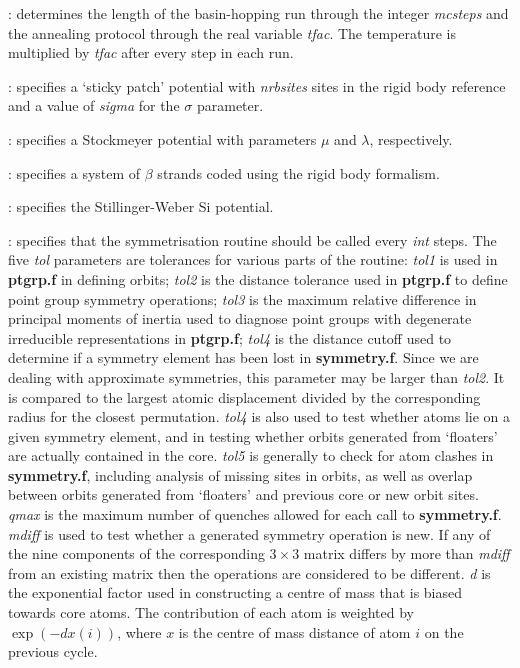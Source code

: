 : determines the length of the
basin-hopping run through the integer {\it mcsteps\/} and the annealing protocol through
the real variable {\it tfac\/}. The temperature is multiplied by {\it tfac\/}
after every step in each run. 

: specifies a `sticky patch' potential with {\it nrbsites}
sites in the rigid body reference and a value of {\it sigma} for the $\sigma$ parameter.

: specifies a Stockmeyer potential with parameters
$\mu$ and $\lambda$, respectively.

: specifies a system of $\beta$ strands coded using the rigid body formalism.

: specifies the Stillinger-Weber Si potential.

: specifies that the symmetrisation
routine should be called every {\it int} steps. The five {\it tol} parameters are tolerances
for various parts of the routine: 
{\it tol1} is used in {\bf ptgrp.f} in defining orbits; 
{\it tol2} is the distance tolerance used in {\bf ptgrp.f} to define point group symmetry operations;
{\it tol3} is the maximum relative difference in principal moments of inertia used to
diagnose point groups with degenerate irreducible representations in {\bf ptgrp.f};
{\it tol4} is the distance cutoff used to determine if a symmetry element has been lost in {\bf symmetry.f}.
Since we are dealing with approximate symmetries, this parameter may be larger than {\it tol2}.
It is compared to the largest atomic displacement divided by the corresponding radius
for the closest permutation.
{\it tol4} is also used to test whether atoms lie on a given symmetry element, and in testing 
whether orbits generated from `floaters' are actually contained in the core.
{\it tol5} is generally to check for atom clashes in {\bf symmetry.f}, including analysis of
missing sites in orbits, as well as overlap between orbits generated from `floaters' and
previous core or new orbit sites.
{\it qmax} is the maximum number of quenches allowed for each call to {\bf symmetry.f}.
{\it mdiff} is used to test whether a generated symmetry operation is new. If any of the nine
components of the corresponding $3\times3$ matrix differs by more than {\it mdiff} from an
existing matrix then the operations are considered to be different.
{\it d} is the exponential factor used in constructing a centre of mass that is biased towards
core atoms. The contribution of each atom is weighted by $\exp(-dx(i))$, where $x$ is the 
centre of mass distance of atom $i$ on the previous cycle.

